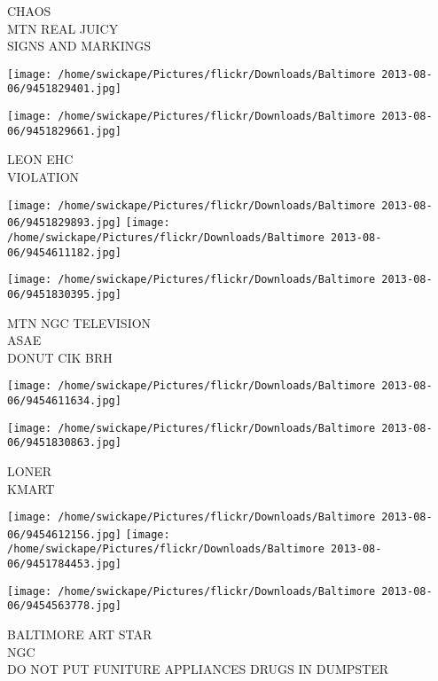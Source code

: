 \documentclass[10pt,letterpaper]{article}
\begin{document}
CHAOS\\
MTN REAL JUICY\\
SIGNS AND MARKINGS
\pagebreak

\texttt{[image: /home/swickape/Pictures/flickr/Downloads/Baltimore 2013-08-06/9451829401.jpg]}

\vspace{0.25in}
\texttt{[image: /home/swickape/Pictures/flickr/Downloads/Baltimore 2013-08-06/9451829661.jpg]}

LEON EHC\\
VIOLATION
\pagebreak

\texttt{[image: /home/swickape/Pictures/flickr/Downloads/Baltimore 2013-08-06/9451829893.jpg]}
\texttt{[image: /home/swickape/Pictures/flickr/Downloads/Baltimore 2013-08-06/9454611182.jpg]}

\texttt{[image: /home/swickape/Pictures/flickr/Downloads/Baltimore 2013-08-06/9451830395.jpg]}

MTN NGC TELEVISION\\
ASAE\\
DONUT CIK BRH
\pagebreak

\texttt{[image: /home/swickape/Pictures/flickr/Downloads/Baltimore 2013-08-06/9454611634.jpg]}

\vspace{0.25in}
\texttt{[image: /home/swickape/Pictures/flickr/Downloads/Baltimore 2013-08-06/9451830863.jpg]}

LONER\\
KMART
\pagebreak

\texttt{[image: /home/swickape/Pictures/flickr/Downloads/Baltimore 2013-08-06/9454612156.jpg]}
\texttt{[image: /home/swickape/Pictures/flickr/Downloads/Baltimore 2013-08-06/9451784453.jpg]}

\vspace{0.25in}
\texttt{[image: /home/swickape/Pictures/flickr/Downloads/Baltimore 2013-08-06/9454563778.jpg]}

BALTIMORE ART STAR\\
NGC\\
DO NOT PUT FUNITURE APPLIANCES DRUGS IN DUMPSTER
\pagebreak
\end{document}
